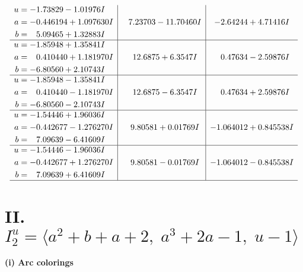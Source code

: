 \documentclass[1p]{elsarticle_modified}
\theoremstyle{definition}
\begin{document}
$$\begin{array}{c|c|c}
\begin{aligned}
u &= -1.73829 - 1.01976 I \\
a &= -0.446194 + 1.097630 I \\
b &= \phantom{-}5.09465 + 1.32883 I\end{aligned}
 & \phantom{-}7.23703 - 11.70460 I & -2.64244 + 4.71416 I \\ \hline\begin{aligned}
u &= -1.85948 + 1.35841 I \\
a &= \phantom{-}0.410440 + 1.181970 I \\
b &= -6.80560 + 2.10743 I\end{aligned}
 & \phantom{-}12.6875 + 6.3547 I & \phantom{-}0.47634 - 2.59876 I \\ \hline\begin{aligned}
u &= -1.85948 - 1.35841 I \\
a &= \phantom{-}0.410440 - 1.181970 I \\
b &= -6.80560 - 2.10743 I\end{aligned}
 & \phantom{-}12.6875 - 6.3547 I & \phantom{-}0.47634 + 2.59876 I \\ \hline\begin{aligned}
u &= -1.54446 + 1.96036 I \\
a &= -0.442677 - 1.276270 I \\
b &= \phantom{-}7.09639 - 6.41609 I\end{aligned}
 & \phantom{-}9.80581 + 0.01769 I & -1.064012 + 0.845538 I \\ \hline\begin{aligned}
u &= -1.54446 - 1.96036 I \\
a &= -0.442677 + 1.276270 I \\
b &= \phantom{-}7.09639 + 6.41609 I\end{aligned}
 & \phantom{-}9.80581 - 0.01769 I & -1.064012 - 0.845538 I\\
 \hline 
 \end{array}$$\newpage\newpage\renewcommand{\arraystretch}{1}
\centering \section*{II. $I^u_{2}= \langle a^2+b+a+2,\;a^3+2 a-1,\;u-1 \rangle$}
\flushleft \textbf{(i) Arc colorings}\\
\end{document}
